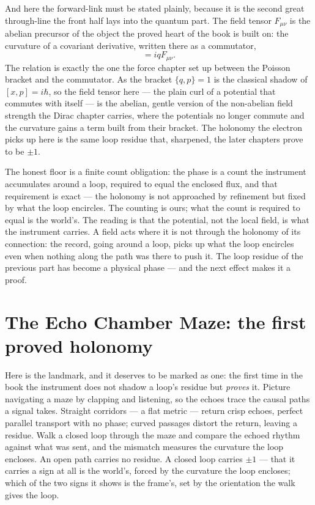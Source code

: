 And here the forward-link must be stated plainly, because it is the second great through-line the front half
lays into the quantum part. The field tensor $F_{\mu\nu}$ is the abelian precursor of the object the proved
heart of the book is built on: the curvature of a covariant derivative, written there as a commutator,
\begin{equation}
  [D_\mu, D_\nu] = iq F_{\mu\nu} .
\end{equation}
The relation is exactly the one the force chapter set up between the Poisson bracket and the commutator. As
the bracket $\{q, p\} = 1$ is the classical shadow of $[x, p] = i\hbar$, so the field tensor here --- the plain
curl of a potential that commutes with itself --- is the abelian, gentle version of the non-abelian field
strength the Dirac chapter carries, where the potentials no longer commute and the curvature gains a term
built from their bracket. The holonomy the electron picks up here is the same loop residue that, sharpened, the
later chapters prove to be $\pm 1$.

The honest floor is a finite count obligation: the phase is a count the instrument accumulates around a loop,
required to equal the enclosed flux, and that requirement is exact --- the holonomy is not approached by
refinement but fixed by what the loop encircles. The counting is ours; what the count is required to equal is
the world's. The reading is that the potential, not the local field, is what the instrument carries. A field acts where it is not through the holonomy of its connection: the record, going
around a loop, picks up what the loop encircles even when nothing along the path was there to push it. The
loop residue of the previous part has become a physical phase --- and the next effect makes it a proof.

\section{The Echo Chamber Maze: the first proved holonomy}
\label{se:echo-chamber-maze}

Here is the landmark, and it deserves to be marked as one: the first time in the book the instrument does not
shadow a loop's residue but \emph{proves} it. Picture navigating a maze by clapping and listening, so the
echoes trace the causal paths a signal takes. Straight corridors --- a flat metric --- return crisp echoes,
perfect parallel transport with no phase; curved passages distort the return, leaving a residue. Walk a closed
loop through the maze and compare the echoed rhythm against what was sent, and the mismatch measures the
curvature the loop encloses. An open path carries no residue. A closed loop carries $\pm 1$ --- that it carries a sign at all is the
world's, forced by the curvature the loop encloses; which of the two signs it shows is the frame's, set by the
orientation the walk gives the loop.

